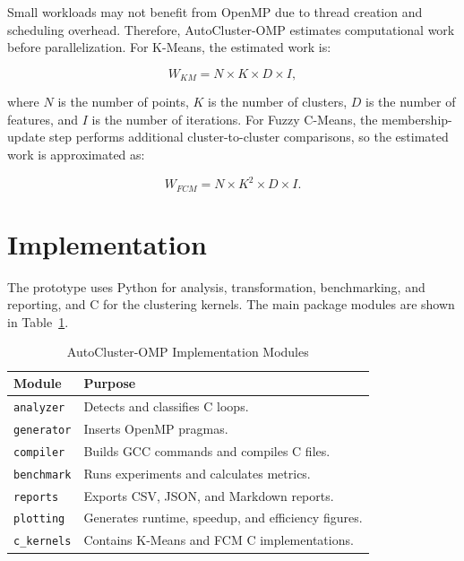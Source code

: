 \documentclass[conference,10pt]{IEEEtran}
\begin{document}
Small workloads may not benefit from OpenMP due to thread creation and scheduling overhead. Therefore, AutoCluster-OMP estimates computational work before parallelization. For K-Means, the estimated work is:

\begin{equation}
W_{KM} = N \times K \times D \times I,
\end{equation}

where $N$ is the number of points, $K$ is the number of clusters, $D$ is the number of features, and $I$ is the number of iterations. For Fuzzy C-Means, the membership-update step performs additional cluster-to-cluster comparisons, so the estimated work is approximated as:

\begin{equation}
W_{FCM} = N \times K^2 \times D \times I.
\end{equation}

\section{Implementation}

The prototype uses Python for analysis, transformation, benchmarking, and reporting, and C for the clustering kernels. The main package modules are shown in Table~\ref{tab:modules}.

\begin{table}[t]
\centering
\caption{AutoCluster-OMP Implementation Modules}
\label{tab:modules}
\scriptsize
\setlength{\tabcolsep}{4pt}
\renewcommand{\arraystretch}{1.12}
\begin{tabularx}{\columnwidth}{p{}X}
\toprule
\textbf{Module} & \textbf{Purpose}\\
\midrule
\texttt{analyzer} & Detects and classifies C loops.\\
\texttt{generator} & Inserts OpenMP pragmas.\\
\texttt{compiler} & Builds GCC commands and compiles C files.\\
\texttt{benchmark} & Runs experiments and calculates metrics.\\
\texttt{reports} & Exports CSV, JSON, and Markdown reports.\\
\texttt{plotting} & Generates runtime, speedup, and efficiency figures.\\
\texttt{c\_kernels} & Contains K-Means and FCM C implementations.\\
\bottomrule
\end{tabularx}
\end{table}
\end{document}
